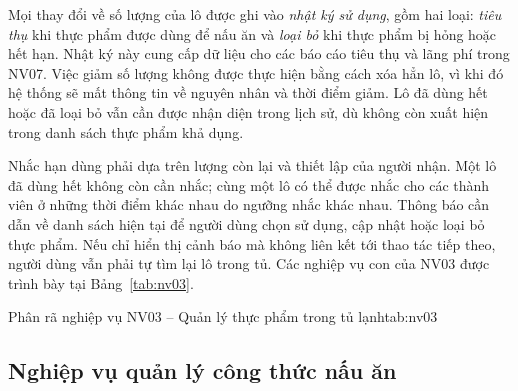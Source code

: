 
Mọi thay đổi về số lượng của lô được ghi vào \emph{nhật ký sử dụng}, gồm hai loại: \emph{tiêu thụ} khi thực phẩm được dùng để nấu ăn và \emph{loại bỏ} khi thực phẩm bị hỏng hoặc hết hạn. Nhật ký này cung cấp dữ liệu cho các báo cáo tiêu thụ và lãng phí trong NV07. Việc giảm số lượng không được thực hiện bằng cách xóa hẳn lô, vì khi đó hệ thống sẽ mất thông tin về nguyên nhân và thời điểm giảm. Lô đã dùng hết hoặc đã loại bỏ vẫn cần được nhận diện trong lịch sử, dù không còn xuất hiện trong danh sách thực phẩm khả dụng.

Nhắc hạn dùng phải dựa trên lượng còn lại và thiết lập của người nhận. Một lô đã dùng hết không còn cần nhắc; cùng một lô có thể được nhắc cho các thành viên ở những thời điểm khác nhau do ngưỡng nhắc khác nhau. Thông báo cần dẫn về danh sách hiện tại để người dùng chọn sử dụng, cập nhật hoặc loại bỏ thực phẩm. Nếu chỉ hiển thị cảnh báo mà không liên kết tới thao tác tiếp theo, người dùng vẫn phải tự tìm lại lô trong tủ. Các nghiệp vụ con của NV03 được trình bày tại Bảng~\ref{tab:nv03}.

\begin{nvtable}{Phân rã nghiệp vụ NV03 – Quản lý thực phẩm trong tủ lạnh}{tab:nv03}
\end{nvtable}

\subsection{Nghiệp vụ quản lý công thức nấu ăn}\label{ssec:nv04}

